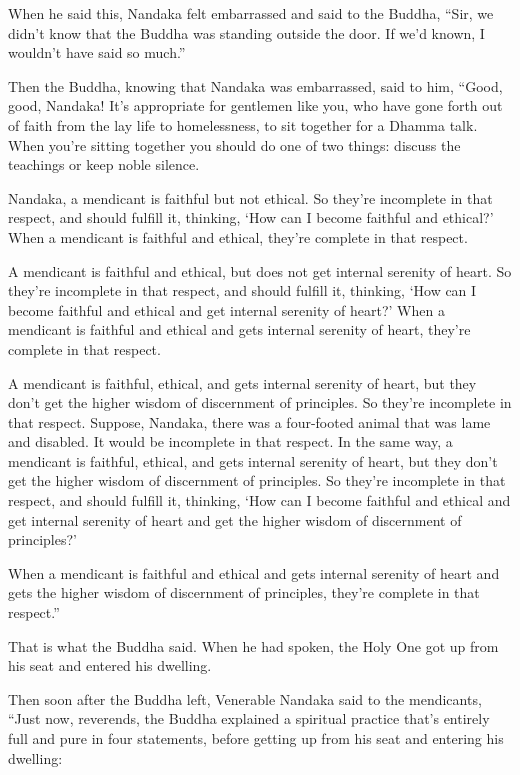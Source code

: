 \documentclass[12pt,openany]{book}%
\begin{document}
When he said this, Nandaka felt embarrassed and said to the Buddha, “Sir, we didn’t know that the Buddha was standing outside the door. If we’d known, I wouldn’t have said so much.” 

Then the Buddha, knowing that Nandaka was embarrassed, said to him, “Good, good, Nandaka! It’s appropriate for gentlemen like you, who have gone forth out of faith from the lay life to homelessness, to sit together for a Dhamma talk. When you’re sitting together you should do one of two things: discuss the teachings or keep noble silence. 

Nandaka, a mendicant is faithful but not ethical. So they’re incomplete in that respect, and should fulfill it, thinking, ‘How can I become faithful and ethical?’ When a mendicant is faithful and ethical, they’re complete in that respect. 

A mendicant is faithful and ethical, but does not get internal serenity of heart. So they’re incomplete in that respect, and should fulfill it, thinking, ‘How can I become faithful and ethical and get internal serenity of heart?’ When a mendicant is faithful and ethical and gets internal serenity of heart, they’re complete in that respect. 

A mendicant is faithful, ethical, and gets internal serenity of heart, but they don’t get the higher wisdom of discernment of principles. So they’re incomplete in that respect. Suppose, Nandaka, there was a four-footed animal that was lame and disabled. It would be incomplete in that respect. In the same way, a mendicant is faithful, ethical, and gets internal serenity of heart, but they don’t get the higher wisdom of discernment of principles. So they’re incomplete in that respect, and should fulfill it, thinking, ‘How can I become faithful and ethical and get internal serenity of heart and get the higher wisdom of discernment of principles?’ 

When a mendicant is faithful and ethical and gets internal serenity of heart and gets the higher wisdom of discernment of principles, they’re complete in that respect.” 

That is what the Buddha said. When he had spoken, the Holy One got up from his seat and entered his dwelling. 

Then soon after the Buddha left, Venerable Nandaka said to the mendicants, “Just now, reverends, the Buddha explained a spiritual practice that’s entirely full and pure in four statements, before getting up from his seat and entering his dwelling: 
\end{document}
